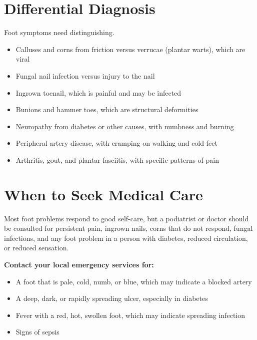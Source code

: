 \section*{Differential Diagnosis}
Foot symptoms need distinguishing.
\begin{itemize}
    \item Calluses and corns from friction versus verrucae (plantar warts), which are viral
    \item Fungal nail infection versus injury to the nail
    \item Ingrown toenail, which is painful and may be infected
    \item Bunions and hammer toes, which are structural deformities
    \item Neuropathy from diabetes or other causes, with numbness and burning
    \item Peripheral artery disease, with cramping on walking and cold feet
    \item Arthritis, gout, and plantar fasciitis, with specific patterns of pain
\end{itemize}

\section*{When to Seek Medical Care}
Most foot problems respond to good self-care, but a podiatrist or doctor should be consulted for persistent pain, ingrown nails, corns that do not respond, fungal infections, and any foot problem in a person with diabetes, reduced circulation, or reduced sensation.

\textbf{Contact your local emergency services for:}
\begin{itemize}
    \item A foot that is pale, cold, numb, or blue, which may indicate a blocked artery
    \item A deep, dark, or rapidly spreading ulcer, especially in diabetes
    \item Fever with a red, hot, swollen foot, which may indicate spreading infection
    \item Signs of sepsis
\end{itemize}

